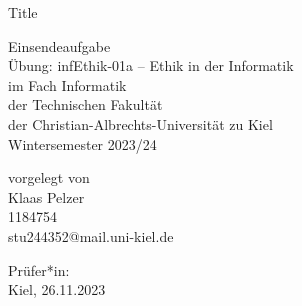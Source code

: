 \begin{titlepage}
    \begin{center}
        {\huge Title\\}
        \vspace{1.5cm}
        \begin{Large}

            Einsendeaufgabe\\
            Übung: infEthik-01a – Ethik in der Informatik\\
            im Fach Informatik\\
            der Technischen Fakultät\\
            der Christian-Albrechts-Universität zu Kiel\\
            Wintersemester 2023/24\\
        \end{Large}
        \vspace{5.0cm}

        vorgelegt von\\
        Klaas Pelzer\\
        1184754\\
        stu244352@mail.uni-kiel.de\\
    \end{center}

    \vfill
    Prüfer*in:\\
    Kiel, 26.11.2023
\end{titlepage}
